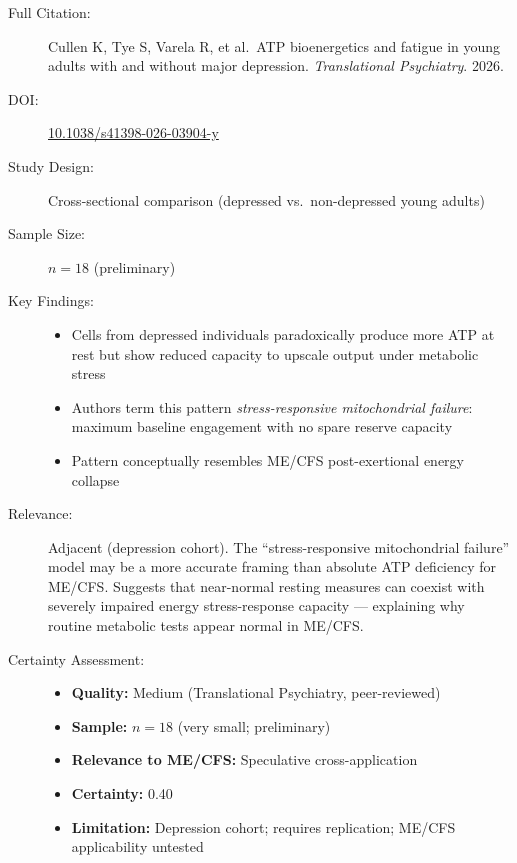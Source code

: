 \begin{description}
    \item[Full Citation:] Cullen K, Tye S, Varela R, et al.\ ATP bioenergetics and fatigue in young adults with and without major depression. \textit{Translational Psychiatry}. 2026. \cite{Cullen2026ATP}
    \item[DOI:] \href{https://doi.org/10.1038/s41398-026-03904-y}{10.1038/s41398-026-03904-y}
    \item[Study Design:] Cross-sectional comparison (depressed vs.\ non-depressed young adults)
    \item[Sample Size:] $n=18$ (preliminary)
    \item[Key Findings:]
    \begin{itemize}
        \item Cells from depressed individuals paradoxically produce more ATP at rest but show reduced capacity to upscale output under metabolic stress
        \item Authors term this pattern \textit{stress-responsive mitochondrial failure}: maximum baseline engagement with no spare reserve capacity
        \item Pattern conceptually resembles ME/CFS post-exertional energy collapse
    \end{itemize}
    \item[Relevance:] Adjacent (depression cohort). The ``stress-responsive mitochondrial failure'' model may be a more accurate framing than absolute ATP deficiency for ME/CFS. Suggests that near-normal resting measures can coexist with severely impaired energy stress-response capacity --- explaining why routine metabolic tests appear normal in ME/CFS.
    \item[Certainty Assessment:]
    \begin{itemize}
        \item \textbf{Quality:} Medium (Translational Psychiatry, peer-reviewed)
        \item \textbf{Sample:} $n=18$ (very small; preliminary)
        \item \textbf{Relevance to ME/CFS:} Speculative cross-application
        \item \textbf{Certainty:} 0.40
        \item \textbf{Limitation:} Depression cohort; requires replication; ME/CFS applicability untested
    \end{itemize}
\end{description}

